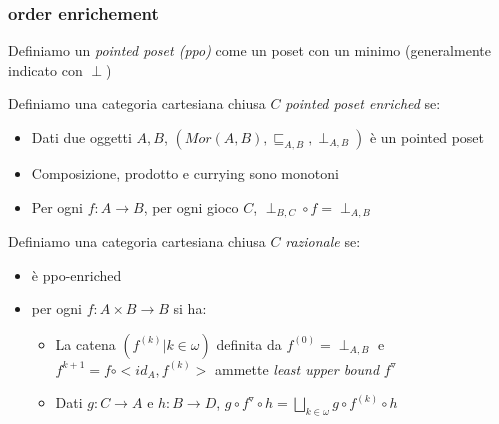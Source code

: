 \documentclass{beamer}
\begin{document}
\begin{frame}
	
	\frametitle{order enrichement}
	
	Definiamo un \emph{pointed poset (ppo)} come un poset con un minimo (generalmente indicato con $\perp$)
	
	Definiamo una categoria cartesiana chiusa $C$ \emph{pointed poset enriched} se:
	\begin{itemize}
		\item Dati due oggetti $A,B$, $(Mor(A,B),\sqsubseteq _{A,B},\perp _{A,B})$ è un pointed poset
		\item Composizione, prodotto e currying sono monotoni
		\item Per ogni $f: A\rightarrow B$, per ogni gioco $C$, $\perp_{B,C} \circ f = \perp _{A,B}$
	\end{itemize}
	
	Definiamo una categoria cartesiana chiusa $C$ \emph{razionale} se:
	\begin{itemize}
		\item è ppo-enriched
		\item per ogni $f: A\times B \rightarrow B$ si ha:
		\begin{itemize}
			\item La catena $(f^{(k)} | k\in \omega)$ definita da $f^{(0)}=\perp _{A,B}$ e $f^{k+1} = f \circ <id_A , f^{(k)}>$ ammette \emph{least upper bound} $f^{\triangledown}$
			\item Dati $g:C\rightarrow A$ e $h:B\rightarrow D$, $g\circ f^\triangledown \circ h = \bigsqcup_{k\in \omega} g \circ f^{(k)} \circ h$
		\end{itemize}

	\end{itemize}
	
\end{frame}
\end{document}
